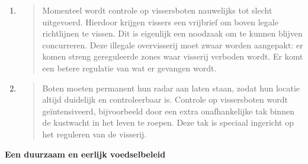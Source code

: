 \begin{enumerate}
\def\labelenumi{\arabic{enumi}.}
\item
  \begin{quote}
  Momenteel wordt controle op vissersboten nauwelijks tot slecht
  uitgevoerd. Hierdoor krijgen vissers een vrijbrief om boven legale
  richtlijnen te vissen. Dit is eigenlijk een noodzaak om te kunnen
  blijven concurreren. Deze illegale overvisserij moet zwaar worden
  aangepakt: er komen streng gereguleerde zones waar visserij verboden
  wordt. Er komt een betere regulatie van wat er gevangen wordt.
  \end{quote}
\item
  \begin{quote}
  Boten moeten permanent hun radar aan laten staan, zodat hun locatie
  altijd duidelijk en controleerbaar is. Controle op vissersboten wordt
  geïntensiveerd, bijvoorbeeld door een extra onafhankelijke tak binnen
  de kustwacht in het leven te roepen. Deze tak is speciaal ingericht op
  het reguleren van de visserij.
  \end{quote}
\end{enumerate}

\textbf{Een duurzaam en eerlijk voedselbeleid}

